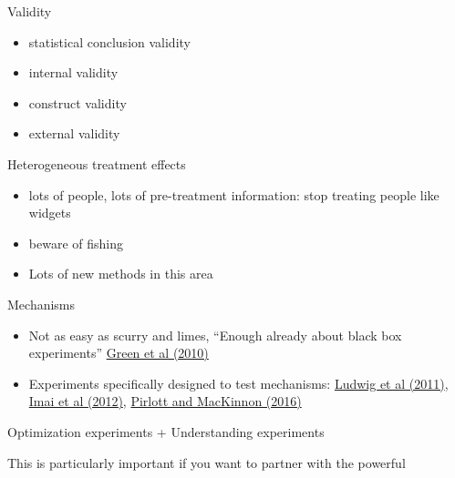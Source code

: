 \documentclass[aspectratio=169]{beamer}
\begin{document}
\begin{frame}

Validity
\begin{itemize}
\item statistical conclusion validity
\item internal validity
\item construct validity
\item external validity
\end{itemize}

\end{frame}
\begin{frame}

Heterogeneous treatment effects 
\begin{itemize}
\item lots of people, lots of pre-treatment information: stop treating people like widgets
\pause
\item beware of fishing
\pause
\item Lots of new methods in this area
\end{itemize}

\end{frame}
\begin{frame}

Mechanisms
\begin{itemize}
\item Not as easy as scurry and limes, ``Enough already about black box experiments''  \textcolor{blue}{\href{http://dx.doi.org/10.1177/0002716209351526}{Green et al (2010)}}
\pause
\item Experiments specifically designed to test mechanisms: \textcolor{blue}{\href{http://dx.doi.org/10.1257/jep.25.3.17}{Ludwig et al (2011)}}, \textcolor{blue}{\href{http://dx.doi.org/10.1111/j.1467-985X.2012.01032.x}{Imai et al (2012)}}, \textcolor{blue}{\href{http://dx.doi.org/10.1016/j.jesp.2015.09.012}{Pirlott and MacKinnon (2016)}}
\end{itemize}

\end{frame}
\begin{frame}

\Large{
\begin{center}
Optimization experiments + Understanding experiments
\end{center}
}

\pause
This is particularly important if you want to partner with the powerful
\end{frame}
\end{document}
